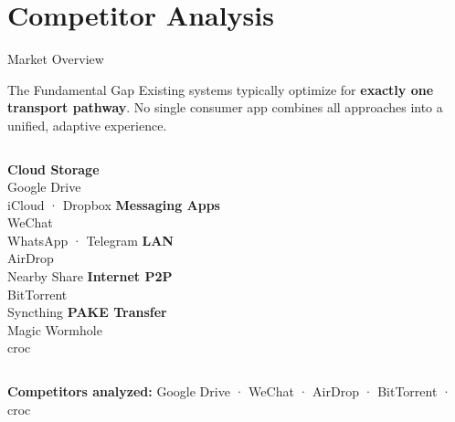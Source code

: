 \documentclass[xcolor=table,dvipsnames,svgnames,aspectratio=169]{beamer}
\begin{document}
\section{Competitor Analysis}

\begin{frame}{Market Overview}
  \begin{block}{The Fundamental Gap}
    Existing systems typically optimize for \textbf{exactly one transport pathway}. No single consumer app combines all approaches into a unified, adaptive experience.
  \end{block}

  \vspace{0.5em}

  \begin{columns}[c]
    \centering\small\textbf{Cloud Storage}\\[0.3em]
    \footnotesize Google Drive\\iCloud · Dropbox
    \centering\small\textbf{Messaging Apps}\\[0.3em]
    \footnotesize WeChat\\WhatsApp · Telegram
    \centering\small\textbf{LAN}\\[0.3em]
    \footnotesize AirDrop\\Nearby Share
    \centering\small\textbf{Internet P2P}\\[0.3em]
    \footnotesize BitTorrent\\Syncthing
    \centering\small\textbf{PAKE Transfer}\\[0.3em]
    \footnotesize Magic Wormhole\\croc
  \end{columns}

  \vspace{0.8em}
  \centering\textbf{Competitors analyzed:} Google Drive · WeChat · AirDrop · BitTorrent · croc
\end{frame}
\end{document}

